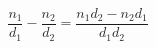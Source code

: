 \documentclass[12pt]{article}
\begin{document}
\sicpsize
\[
\frac{n_1}{d_1} - \frac{n_2}{d_2} = \frac{n_1d_2 - n_2d_1}{d_1d_2}
\]
\end{document}
